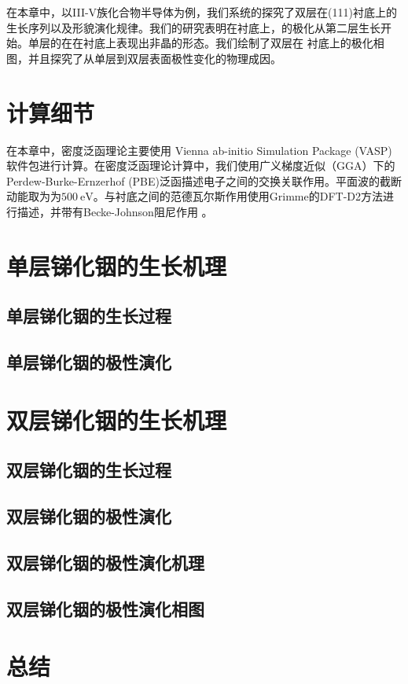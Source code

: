     在本章中，以III-V族化合物半导体为例，我们系统的探究了双层在(111)衬底上的生长序列以及形貌演化规律。我们的研究表明在衬底上，的极化从第二层生长开始。单层的在在衬底上表现出非晶的形态。我们绘制了双层在
    衬底上的极化相图，并且探究了从单层到双层表面极性变化的物理成因。
\section{计算细节}
    在本章中，密度泛函理论主要使用 Vienna ab-initio Simulation Package (VASP) 软件包进行计算。在密度泛函理论计算中，我们使用广义梯度近似（GGA）下的 Perdew-Burke-Ernzerhof (PBE)泛函描述电子之间的交换关联作用。平面波的截断动能取为为$\SI{500}{\electronvolt}$。与衬底之间的范德瓦尔斯作用使用Grimme的DFT-D2方法进行描述，并带有Becke-Johnson阻尼作用 。


\section{单层锑化铟的生长机理}
    \subsection{单层锑化铟的生长过程}
    \subsection{单层锑化铟的极性演化}
\section{双层锑化铟的生长机理}
    \subsection{双层锑化铟的生长过程}
    \subsection{双层锑化铟的极性演化}
    \subsection{双层锑化铟的极性演化机理}
    \subsection{双层锑化铟的极性演化相图}
\section{总结}